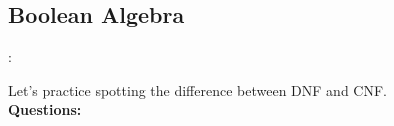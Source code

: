
\subsection{Boolean Algebra}:

\noindent
Let's practice spotting the difference between DNF and CNF.\\

\noindent
\textbf{Questions:}



